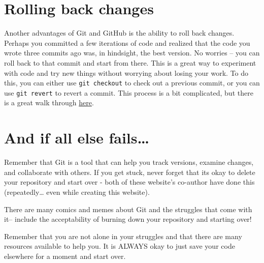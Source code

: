 \documentclass[
]{book}
\begin{document}
\section{Rolling back changes}\label{rolling-back-changes}

Another advantages of Git and GitHub is the ability to roll back changes.
Perhaps you committed a few iterations of code and realized that
the code you wrote three commits ago was, in hindsight, the best version. No worries -- you can roll
back to that commit and start from there. This is a great way to experiment with
code and try new things without worrying about losing your work. To do this, you
can either use \texttt{git\ checkout} to check out a previous commit, or you can use
\texttt{git\ revert} to revert a commit. This process is a bit complicated, but there is
a great walk through \href{https://swcarpentry.github.io/git-novice/05-history.html}{here}.

\section{And if all else fails\ldots{}}\label{and-if-all-else-fails}

Remember that Git is a tool that can help you track versions, examine changes,
and collaborate with others. If you get stuck, never forget that its okay to
delete your repository and start over - both of these website's co-author have
done this (repeatedly\ldots{} even while creating this website).

There are many comics and memes about Git and the struggles that come with it-- include the acceptability of burning down your repository and starting over!

Remember that you are not alone in your struggles and that there are many resources available to help you. It is ALWAYS okay to just save your code elsewhere for a moment and start over.

  
\end{document}

